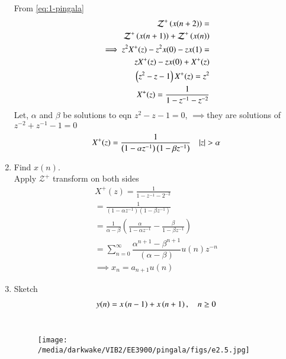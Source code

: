 \documentclass[journal,12pt,twocolumn]{IEEEtran}
\renewcommand\thesection{\arabic{section}}
\begin{document}
\begin{enumerate}[label=\thesection.\arabic*,ref=\thesection.\theenumi]
\solution From \eqref{eq:1-pingala}
\begin{align}
	\mathcal{Z}^+\left(x(n + 2)\right) =\\ \mathcal{Z}^+\left(x(n + 1)\right) + \mathcal{Z}^+\left(x(n)\right) \\
	\implies z^2X^+(z) - z^2x(0) - zx(1)  = \\zX^+(z) - zx(0) + X^+(z)\\
	\left(z^2 - z - 1\right)X^+(z) = z^2 \\
	X^+(z) = \frac{1}{1 - z^{-1} - z^{-2}} 
\end{align}
Let, $\alpha$ and $\beta$ be solutions to eqn $z^2 - z - 1 = 0$,
$\implies $they are solutions of  $z^{-2} + z^{-1} - 1 = 0$
\begin{align}
	X^{+}(z)= \frac{1}{\left(1 - \alpha z^{-1}\right)\left(1 - \beta z^{-1}\right)} \quad |z| > \alpha
	\label{eq:X-z}
\end{align}
\item Find $x(n)$.\\
\solution
Apply $\mathcal{Z}^+$ transform on both sides
\begin{align}
	X^{+}(z) =	\frac{1}{1-z^{-1}-2^{-2}}\\
	=\frac{1}{\left(1-\alpha z^{-1}\right)\left(1-\beta z^{-1}\right)}\\
	=\frac{1}{\alpha-\beta}\left(\frac{\alpha}{1-\alpha z^{-1}}-\frac{\beta}{1-\beta z^{-1}}\right)\\
	=\sum_{n=0}^{\infty} \dfrac{\alpha^{n+1} - \beta^{n+1}}{(\alpha - \beta)}u(n)z^{-n}\\
	\implies x_n = a_{n+1}u(n)
\end{align}
\item Sketch 
\begin{align}
	y(n)	 = x\left(n-1\right) + x\left(n+1\right),  \quad n \ge 0
	\label{eq:10-orig-diff-rev}
\end{align}
\solution\\
\begin{figure}[!ht]
	\texttt{[image: /media/darkwake/VIB2/EE3900/pingala/figs/e2.5.jpg]}
	\label{fig:xan}
\end{figure}
\newline



\end{enumerate}
\end{document}
